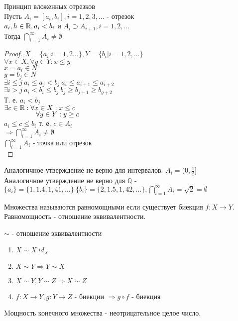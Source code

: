 
\begin{theorem} Принцип вложенных отрезков\\

Пусть $A_i = [a_i, b_i], i = 1,2,3,\dots$ - отрезок \\
$ a_i, h \in \mathbb{R}, a_i < b_i $ и $ A_i \supset A_{i+1} , i=1,2,\dots $ \\
Тогда $ \bigcap_{i=1}^{\infty} A_i \neq \emptyset $\\
\begin{proof} $ X = \{ a_i | i=1,2\dots \}, Y=\{b_i | i = 1,2,\dots\} $ \\
$ \forall x \in X, \forall y \in Y: x \leq y $ \\
$ x = a_i \in N $\\
$ y = b_j  \in N$ \\
$ \exists i \leq j \ a_i \leq a_j < b_j \ a_i \leq a_{i+1} \leq a_{i+2} $ \\
$ \exists i > j \ a_i < b_i \leq b_j \ b_j \geq b_{j+1} \geq b_{g+2} $\\
Т. е. $ a_i < b_j $ \\
$ \exists c \in \mathbb{R} : \forall x \in X : x \leq c $ \\
$ \hspace*{16mm} \forall y \in Y : y \geq c $ \\
$ a_i \leq c \leq b_i $ т. е. $c \in A_i$ \\ 
$\Rightarrow \bigcap_{i=1}^{\infty} A_i \neq \emptyset$ \\
$ \bigcap_{i=1}^{\infty} A_i $ - точка или отрезок \\
\end{proof}
Аналогичное утверждение не верно для интервалов. $ A_i = (0, \frac{1}{i} ]$ \\
Аналогичное утверждение не верно для $\mathbb{Q}$ - $ \{a_i\} = \{1, 1.4, 1,41, \dots\}   \ \{b_i\} = \{2, 1.5, 1,42, \dots\},   \bigcap_{i=1}^{\infty} A_i = \sqrt{2} = \emptyset$
\end{theorem}


\begin{definition}
	Множества называются равномощными если существует биекция $ f: X \rightarrow Y $. Равномощность - отношение эквивалентности.\\
\end{definition}

\begin{definition} $ \sim $ - отношение эквивалентности \\
	\begin{enumerate}
		\item $X \sim X \ id_X$
		\item $ X \sim Y \Rightarrow Y \sim X$ 
		\item $ X \sim Y, Y \sim Z \Rightarrow X \sim Z $ 
		\item $ f: X \rightarrow Y, g: Y \rightarrow Z $ - биекции $\Rightarrow g \circ f $ - биекция 
	\end{enumerate}
\end{definition}
Mощность конечного множества - неотрицательное целое число. \\

